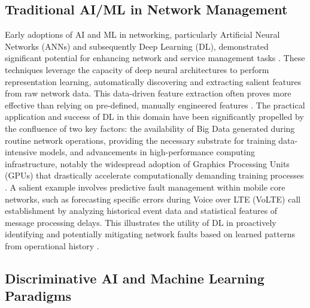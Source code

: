 \documentclass[sigconf]{acmart}
\begin{document}
\subsection{Traditional AI/ML in Network Management}

Early adoptions of AI and ML in networking, particularly Artificial Neural Networks (ANNs) and subsequently Deep Learning (DL), demonstrated significant potential for enhancing network and service management tasks \cite{ref28}. These techniques leverage the capacity of deep neural architectures to perform representation learning, automatically discovering and extracting salient features from raw network data. This data-driven feature extraction often proves more effective than relying on pre-defined, manually engineered features \cite{ref28}. The practical application and success of DL in this domain have been significantly propelled by the confluence of two key factors: the availability of Big Data generated during routine network operations, providing the necessary substrate for training data-intensive models, and advancements in high-performance computing infrastructure, notably the widespread adoption of Graphics Processing Units (GPUs) that drastically accelerate computationally demanding training processes \cite{ref2, ref28}. A salient example involves predictive fault management within mobile core networks, such as forecasting specific errors during Voice over LTE (VoLTE) call establishment by analyzing historical event data and statistical features of message processing delays. This illustrates the utility of DL in proactively identifying and potentially mitigating network faults based on learned patterns from operational history \cite{ref28}.

\subsection{Discriminative AI and Machine Learning Paradigms}
\end{document}
